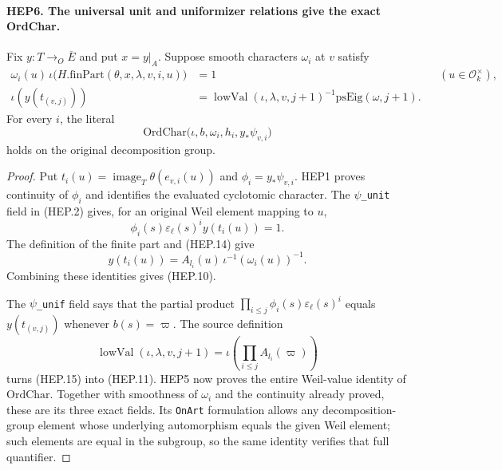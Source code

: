 \documentclass[11pt,a4paper]{article}
\numberwithin{equation}{section}
\theoremstyle{remark}\newtheorem{remark}[theorem]{Remark}
\begin{document}
\paragraph{HEP6. The universal unit and uniformizer relations give the exact OrdChar.}
\label{claim:HEP6}
Fix $y:T\to_O\overline E$ and put $x=y|_A$.
Suppose smooth characters $\omega_i$ at $v$ satisfy
\begin{align}
 \omega_i(u)\,\iota\bigl(H.\mathrm{finPart}(\theta,x,\lambda,v,i,u)\bigr)
       &=1 &&(u\in\mathcal O_k^\times), \tag{HEP.14}\\
 \iota(y(t_{(v,j)}))
       &=\operatorname{lowVal}(\iota,\lambda,v,j+1)^{-1}
                                      \mathrm{psEig}(\omega,j+1).
                                                        \tag{HEP.15}
\end{align}
For every $i$, the literal
\[
 \mathrm{OrdChar}\bigl(\iota,b,\omega_i,h_i,
                                      y_*\psi_{v,i}\bigr)
 \tag{HEP.16}
\]
holds on the original decomposition group.
\begin{proof}
Put $t_i(u)=\operatorname{image}_T\theta(e_{v,i}(u))$ and
$\phi_i=y_*\psi_{v,i}$.  HEP1 proves continuity of $\phi_i$
and identifies the evaluated cyclotomic character.
The \texttt{\(\psi\)\_\allowbreak unit} field in (HEP.2) gives, for an
original Weil element mapping to $u$,
\[
                 \phi_i(s)\varepsilon_\ell(s)^i y(t_i(u))=1.
\]
The definition of the finite part and (HEP.14) give
\[
                  y(t_i(u))=A_{l_i}(u)\,
                                   \iota^{-1}(\omega_i(u))^{-1}.
\]
Combining these identities gives (HEP.10).

The \texttt{\(\psi\)\_\allowbreak unif} field says that the partial product
$\prod_{i\leq j}\phi_i(s)\varepsilon_\ell(s)^i$ equals
$y(t_{(v,j)})$ whenever $b(s)=\varpi$.
The source definition
\[
 \operatorname{lowVal}(\iota,\lambda,v,j+1)
            =\iota\left(\prod_{i\leq j}A_{l_i}(\varpi)\right)
\]
turns (HEP.15) into (HEP.11).  HEP5 now proves the entire
Weil-value identity of $\mathrm{OrdChar}$.
Together with smoothness of $\omega_i$ and the continuity already
proved, these are its three exact fields.  Its \texttt{On\allowbreak Art}
formulation allows any decomposition-group element whose underlying
automorphism equals the given Weil element; such elements are equal
in the subgroup, so the same identity verifies that full quantifier.
\end{proof}

\end{document}

